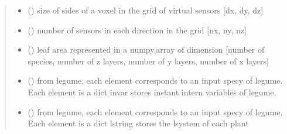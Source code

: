 \documentclass[letterpaper,10pt,english]{sphinxmanual}
\begin{document}
\begin{fulllineitems}
\begin{quote}
\begin{description}
\begin{itemize}
\begin{sphinxVerbatim}[commandchars=\\\{\}]
\PYG{p}{[}\PYG{p}{]}    
\PYG{p}{[}\PYG{p}{]}    
\end{sphinxVerbatim}


\item {} 
\sphinxAtStartPar
{} () \textendash{} size of sides of a voxel in the grid of virtual sensors {[}dx, dy, dz{]}

\item {} 
\sphinxAtStartPar
{} () \textendash{} number of sensors in each direction in the grid {[}nx, ny, nz{]}

\item {} 
\sphinxAtStartPar
{} () \textendash{} leaf area represented in a numpy.array of dimension
{[}number of species, number of z layers, number of y layers, number of x layers{]}

\item {} 
\sphinxAtStartPar
{} () \textendash{} from l\sphinxhyphen{}egume, each element corresponds to an input specy of l\sphinxhyphen{}egume. Each element is a dict invar stores instant intern variables of l\sphinxhyphen{}egume.

\item {} 
\sphinxAtStartPar
{} () \textendash{} from l\sphinxhyphen{}egume, each element corresponds to an input specy of l\sphinxhyphen{}egume. Each element is a dict lstring stores the l\sphinxhyphen{}system of each plant


\end{itemize}
\end{description}
\end{quote}
\end{fulllineitems}
\end{document}
